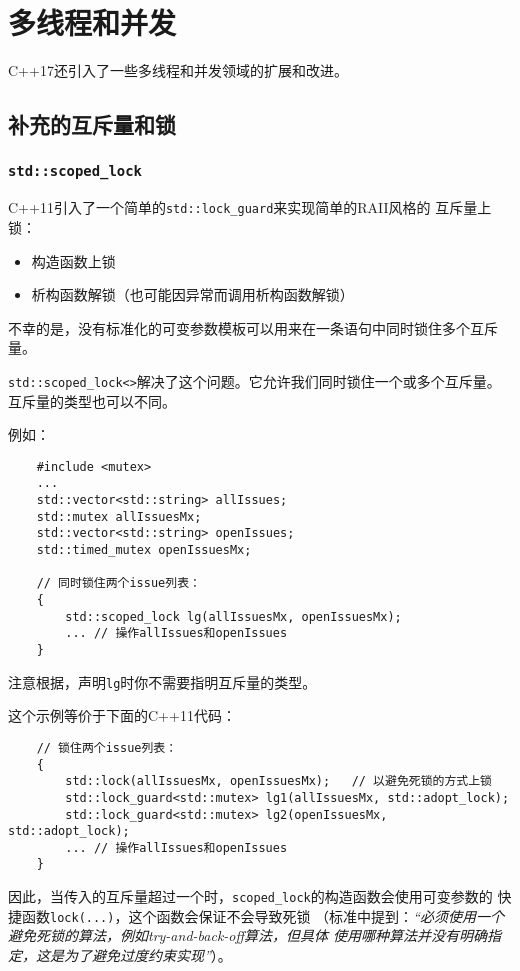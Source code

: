 \chapter{多线程和并发}\label{ch27}
C++17还引入了一些多线程和并发领域的扩展和改进。


\section{补充的互斥量和锁}

\subsection{\texttt{std::scoped\_lock}}\label{ch27.1.1}
C++11引入了一个简单的\texttt{std::lock\_guard}来实现简单的RAII风格的
互斥量上锁：
\begin{itemize}
    \item 构造函数上锁
    \item 析构函数解锁（也可能因异常而调用析构函数解锁）
\end{itemize}
不幸的是，没有标准化的可变参数模板可以用来在一条语句中同时锁住多个互斥量。

\texttt{std::scoped\_lock<>}解决了这个问题。它允许我们同时锁住一个或多个互斥量。
互斥量的类型也可以不同。

例如：
\begin{lstlisting}
    #include <mutex>
    ...
    std::vector<std::string> allIssues;
    std::mutex allIssuesMx;
    std::vector<std::string> openIssues;
    std::timed_mutex openIssuesMx;

    // 同时锁住两个issue列表：
    {
        std::scoped_lock lg(allIssuesMx, openIssuesMx);
        ... // 操作allIssues和openIssues
    }
\end{lstlisting}
注意根据，声明\texttt{lg}时你不需要指明互斥量的类型。

这个示例等价于下面的C++11代码：
\begin{lstlisting}
    // 锁住两个issue列表：
    {
        std::lock(allIssuesMx, openIssuesMx);   // 以避免死锁的方式上锁
        std::lock_guard<std::mutex> lg1(allIssuesMx, std::adopt_lock);
        std::lock_guard<std::mutex> lg2(openIssuesMx, std::adopt_lock);
        ... // 操作allIssues和openIssues
    }
\end{lstlisting}
因此，当传入的互斥量超过一个时，\texttt{scoped\_lock}的构造函数会使用可变参数的
快捷函数\texttt{lock(...)}，这个函数会保证不会导致死锁
（标准中提到：\emph{“必须使用一个避免死锁的算法，例如try-and-back-off算法，但具体
使用哪种算法并没有明确指定，这是为了避免过度约束实现”}）。

